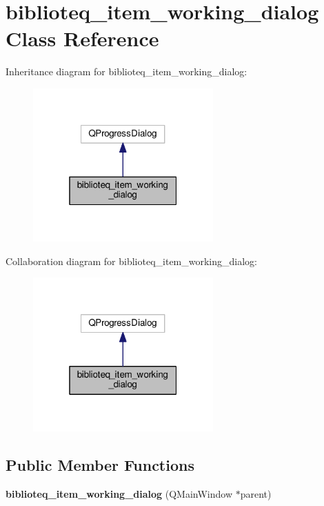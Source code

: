 \hypertarget{classbiblioteq__item__working__dialog}{}\section{biblioteq\+\_\+item\+\_\+working\+\_\+dialog Class Reference}
\label{classbiblioteq__item__working__dialog}


Inheritance diagram for biblioteq\+\_\+item\+\_\+working\+\_\+dialog\+:
\nopagebreak
\begin{figure}[H]
\begin{center}
\leavevmode
\includegraphics[width=196pt]{classbiblioteq__item__working__dialog__inherit__graph}
\end{center}
\end{figure}


Collaboration diagram for biblioteq\+\_\+item\+\_\+working\+\_\+dialog\+:
\nopagebreak
\begin{figure}[H]
\begin{center}
\leavevmode
\includegraphics[width=196pt]{classbiblioteq__item__working__dialog__coll__graph}
\end{center}
\end{figure}
\subsection*{Public Member Functions}
\begin{DoxyCompactItemize}
\item 
{\bfseries biblioteq\+\_\+item\+\_\+working\+\_\+dialog} (Q\+Main\+Window $\ast$parent)\hypertarget{classbiblioteq__item__working__dialog_aabd2c6535a5e68ea8c0be9fa1ebaa6a8}{}\label{classbiblioteq__item__working__dialog_aabd2c6535a5e68ea8c0be9fa1ebaa6a8}

\end{DoxyCompactItemize}
